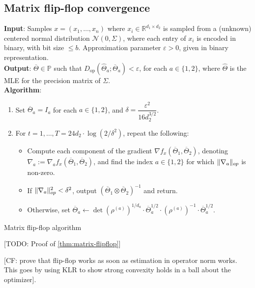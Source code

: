 \documentclass[aos]{imsart}
\theoremstyle{definition}
\numberwithin{equation}{section}
\DeclareMathOperator{\op}{op}
\DeclarePairedDelimiter{\norm}{\lVert}{\rVert}
\newcommand{\R}{{\mathbb{R}}}
\newcommand{\otheta}{\overline{\Theta}}
\newcommand{\htheta}{\widehat{\Theta}}
\newcommand{\eps}{\varepsilon}
\newcommand{\cN}{\mathcal{N}}
\newcommand{\SPD}{\mathbb{P}}
\newcommand{\samp}{x}
\newcommand{\CF}[1]{{\color{purple}[CF: #1]}}
\newcommand{\TODO}[1]{{\color{blue}[TODO: #1]}}
\begin{document}
\subsection{Matrix flip-flop convergence}
\begin{Algorithm}
\textbf{Input}: Samples $\samp = (\samp_1, \ldots, \samp_n)$ where $\samp_i \in \R^{d_1 \times d_2}$ is sampled from a (unknown) centered normal distribution $\cN(0, \Sigma)$, where each entry of $\samp_i$ is encoded in binary, with bit size $\le b$. Approximation parameter $\eps > 0$, given in binary representation. \\[.3ex]

\textbf{Output}: $\otheta \in \SPD$ such that $D_{\op}(\htheta_a; \otheta_a) < \eps$, for each $a \in \{1,2\}$, where $\htheta$ is the MLE for the precision matrix of $\Sigma$. \\[.3ex]

\textbf{Algorithm}:
\begin{enumerate}
\item\label{it:flip-flop step 1 matrix} Set $\otheta_a = I_a$ for each $a \in \{1,2\}$, and $\delta = \dfrac{\eps^2}{16 d_2^{3/2}}$.
\item\label{it:flip-flop step 2 matrix} For $t=1,\dots,T = 24 d_2 \cdot \log(2/\delta^2)$, repeat the following:
\begin{itemize}
\item Compute each component of the gradient $\nabla f_{\samp}(\otheta_1, \otheta_2)$, denoting $\nabla_a := \nabla_a f_{\samp}(\otheta_1, \otheta_2)$, and find the index $a \in \{1,2\}$ for which $\norm{\nabla_a}_{op}$ is non-zero.
\item
If $\norm{\nabla_a}_{op}^2 < \delta^2$, output $\left( \otheta_1 \otimes \otheta_2 \right)^{-1}$ and return.
\item Otherwise, set $\otheta_a \leftarrow \det(\rho^{(a)})^{1/d_a} \cdot \otheta_a^{1/2} \cdot (\rho^{(a)})^{-1} \cdot \otheta_a^{1/2}$.
\end{itemize}
\end{enumerate}
\caption{Matrix flip-flop algorithm}\label{alg:flip-flop matrix}
\end{Algorithm}

\TODO{Proof of \cref{thm:matrix-flipflop}}


\CF{prove that flip-flop works as soon as estimation in operator norm works. This goes by using KLR to show strong convexity holds in a ball about the optimizer}.
\end{document}

